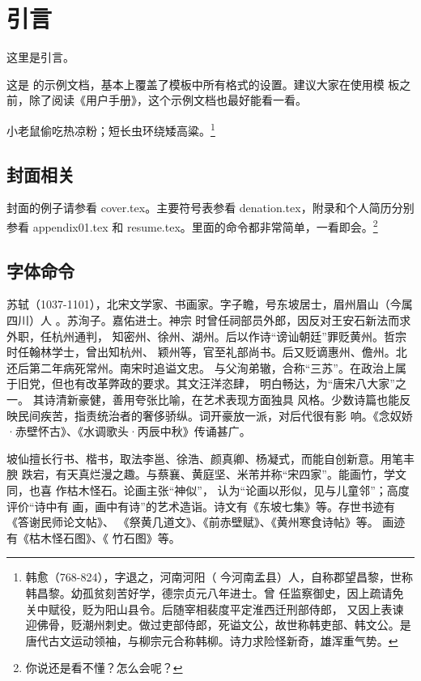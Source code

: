 \chapter{引言}
这里是引言。

这是 的示例文档，基本上覆盖了模板中所有格式的设置。建议大家在使用模
板之前，除了阅读《用户手册》，这个示例文档也最好能看一看。

小老鼠偷吃热凉粉；短长虫环绕矮高粱。\footnote{韩愈（768-824），字退之，河南河阳（
	今河南孟县）人，自称郡望昌黎，世称韩昌黎。幼孤贫刻苦好学，德宗贞元八年进士。曾
	任监察御史，因上疏请免关中赋役，贬为阳山县令。后随宰相裴度平定淮西迁刑部侍郎，
	又因上表谏迎佛骨，贬潮州刺史。做过吏部侍郎，死谥文公，故世称韩吏部、韩文公。是
	唐代古文运动领袖，与柳宗元合称韩柳。诗力求险怪新奇，雄浑重气势。}


\section{封面相关}
封面的例子请参看 cover.tex。主要符号表参看 denation.tex，附录和个人简历分别参看 appendix01.tex
和 resume.tex。里面的命令都非常简单，一看即会。\footnote{你说还是看不懂？怎么会呢？}

\section{字体命令}
\label{sec:first}

苏轼（1037-1101），北宋文学家、书画家。字子瞻，号东坡居士，眉州眉山（今属四川）人
。苏洵子。嘉佑进士。神宗 时曾任祠部员外郎，因反对王安石新法而求外职，任杭州通判，
知密州、徐州、湖州。后以作诗“谤讪朝廷”罪贬黄州。哲宗时任翰林学士，曾出知杭州、
颖州等，官至礼部尚书。后又贬谪惠州、儋州。北还后第二年病死常州。南宋时追谥文忠。
与父洵弟辙，合称“三苏”。在政治上属于旧党，但也有改革弊政的要求。其文汪洋恣肆，
明白畅达，为“唐宋八大家”之一。  其诗清新豪健，善用夸张比喻，在艺术表现方面独具
风格。少数诗篇也能反映民间疾苦，指责统治者的奢侈骄纵。词开豪放一派，对后代很有影
响。《念奴娇·赤壁怀古》、《水调歌头·丙辰中秋》传诵甚广。

{坡仙擅长行书、楷书，取法李邕、徐浩、颜真卿、杨凝式，而能自创新意。用笔丰腴
	跌宕，有天真烂漫之趣。与蔡襄、黄庭坚、米芾并称“宋四家”。能画竹，学文同，也喜
	作枯木怪石。论画主张“神似”， 认为“论画以形似，见与儿童邻”；高度评价“诗中有
	画，画中有诗”的艺术造诣。诗文有《东坡七集》等。存世书迹有《答谢民师论文帖》、
	《祭黄几道文》、《前赤壁赋》、《黄州寒食诗帖》等。  画迹有《枯木怪石图》、《
	竹石图》等。}

